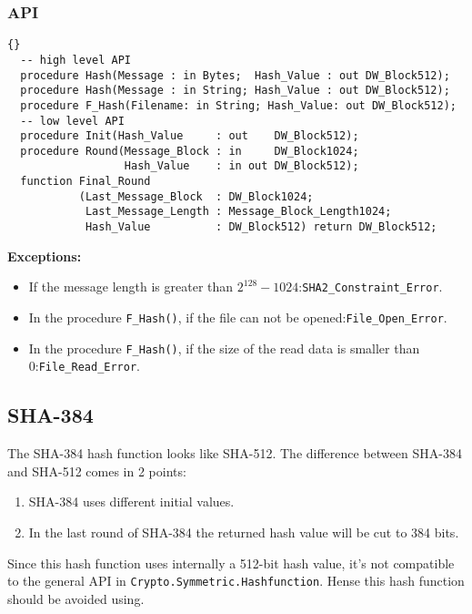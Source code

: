 \subsubsection*{API}
\begin{lstlisting}{}
  -- high level API
  procedure Hash(Message : in Bytes;  Hash_Value : out DW_Block512);
  procedure Hash(Message : in String; Hash_Value : out DW_Block512);
  procedure F_Hash(Filename: in String; Hash_Value: out DW_Block512); 
  -- low level API
  procedure Init(Hash_Value     : out    DW_Block512);
  procedure Round(Message_Block : in     DW_Block1024;
                  Hash_Value    : in out DW_Block512);
  function Final_Round
           (Last_Message_Block  : DW_Block1024;
            Last_Message_Length : Message_Block_Length1024;
            Hash_Value          : DW_Block512) return DW_Block512;
\end{lstlisting}
\textbf{Exceptions:}
\begin{itemize}
\item If the message length is greater than
  $2^{128}-1024$:\quad\texttt{SHA2\_Constraint\_Error}.
\item In the procedure \texttt{F\_Hash()}, if the file can not be
  opened:\quad\texttt{File\_Open\_Error}.
\item In the procedure \texttt{F\_Hash()}, if the size of the read
  data is smaller than 0:\quad\texttt{File\_Read\_Error}.
\end{itemize}


\subsection{SHA-384}
The SHA-384 hash function looks like SHA-512. The difference between
SHA-384 and SHA-512 comes in 2 points:
\begin{enumerate}
\item SHA-384 uses different initial values.
\item In the last round of SHA-384 the returned hash value will be  cut to 384 bits.
\end{enumerate}
Since this hash function uses internally a 512-bit hash value, it's
not compatible to the general API in
\texttt{Crypto.Symmetric.Hashfunction}. Hense this hash function
should be avoided using.
